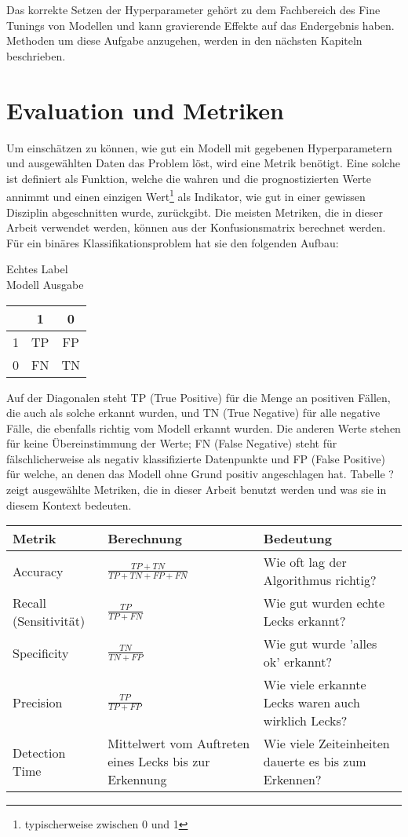 Das korrekte Setzen der Hyperparameter gehört zu dem Fachbereich des Fine Tunings von Modellen und kann
 gravierende Effekte auf das Endergebnis haben. Methoden um diese Aufgabe anzugehen, werden in den
 nächsten Kapiteln beschrieben.


\section{Evaluation und Metriken}

Um einschätzen zu können, wie gut ein Modell mit gegebenen Hyperparametern und ausgewählten Daten das Problem
 löst, wird eine Metrik benötigt. Eine solche ist definiert als Funktion, welche die wahren und die
 prognostizierten Werte annimmt und einen einzigen Wert\footnote{typischerweise zwischen 0 und 1} als
 Indikator, wie gut in einer gewissen Disziplin abgeschnitten wurde, zurückgibt. Die meisten Metriken,
 die in dieser Arbeit verwendet werden, können aus der Konfusionsmatrix berechnet werden. Für ein binäres
 Klassifikationsproblem hat sie den folgenden Aufbau:

\begin{center}
    \hspace{3.1cm}Echtes Label \\ Modell Ausgabe
    \begin{tabular}{ c | c c | }
      & 1 & 0 \\ 
     \hline
     1 & TP & FP \\  
     0 & FN & TN \\
     \hline  
    \end{tabular}
\end{center}

Auf der Diagonalen steht TP (True Positive) für die Menge an positiven Fällen, die auch als solche erkannt
 wurden, und TN (True Negative) für alle negative Fälle, die ebenfalls richtig vom Modell erkannt wurden.
 Die anderen Werte stehen für keine Übereinstimmung der Werte; FN (False Negative) steht für fälschlicherweise
 als negativ klassifizierte Datenpunkte und FP (False Positive) für welche, an denen das Modell ohne Grund
 positiv angeschlagen hat. Tabelle ? zeigt ausgewählte Metriken, die in dieser Arbeit benutzt werden und was sie
 in diesem Kontext bedeuten.

 \renewcommand{\arraystretch}{2}
\begin{tabular}{ m{6em} m{7em} m{16em} }
    Metrik & Berechnung & Bedeutung \\
    \hline
    Accuracy              & $\frac{TP+TN}{TP+TN+FP+FN}$ & Wie oft lag der Algorithmus richtig? \\
    Recall (Sensitivität) & $\frac{TP}{TP+FN}$          & Wie gut wurden echte Lecks erkannt? \\
    Specificity           & $\frac{TN}{TN+FP}$          & Wie gut wurde 'alles ok' erkannt? \\
    Precision             & $\frac{TP}{TP+FP}$          & Wie viele erkannte Lecks waren auch wirklich Lecks? \\
    Detection Time        & Mittelwert vom Auftreten eines Lecks bis zur Erkennung & Wie viele Zeiteinheiten dauerte es bis zum Erkennen?
\end{tabular}

